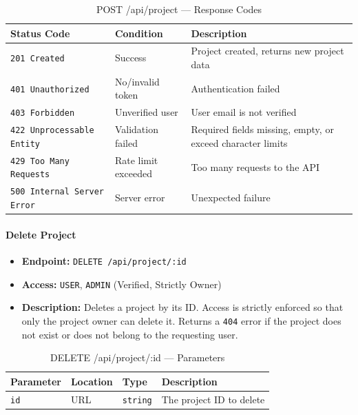 \begin{table}[H]
\centering
\renewcommand{\arraystretch}{1.3}
\begin{tabularx}{\textwidth}{|l|l|X|}
\hline
\textbf{Status Code} & \textbf{Condition} & \textbf{Description} \\
\hline
\texttt{201 Created}      & Success            & Project created, returns new project data \\
\hline
\texttt{401 Unauthorized} & No/invalid token   & Authentication failed \\
\hline
\texttt{403 Forbidden}    & Unverified user & User email is not verified \\
\hline
\texttt{422 Unprocessable Entity} & Validation failed & Required fields missing, empty, or exceed character limits \\
\hline
\texttt{429 Too Many Requests} & Rate limit exceeded & Too many requests to the API \\
\hline
\texttt{500 Internal Server Error} & Server error & Unexpected failure \\
\hline
\end{tabularx}
\caption{POST /api/project — Response Codes}
\label{tab:create-project-responses}
\end{table}
\FloatBarrier

\paragraph{Delete Project}
\label{subsubsec:delete-project}

\begin{itemize}
  \item \textbf{Endpoint:} \texttt{DELETE /api/project/:id}
  \item \textbf{Access:} \texttt{USER}, \texttt{ADMIN} (Verified, Strictly Owner)
  \item \textbf{Description:} Deletes a project by its ID.
  Access is strictly enforced so that only the project owner can delete it.
  Returns a \texttt{404} error if the project does not exist or does not belong to the requesting user.
\end{itemize}

\begin{table}[H]
\centering
\renewcommand{\arraystretch}{1.3}
\begin{tabularx}{\textwidth}{|l|l|l|X|}
\hline
\textbf{Parameter} & \textbf{Location} & \textbf{Type} & \textbf{Description} \\
\hline
\texttt{id} & URL & \texttt{string} & The project ID to delete \\
\hline
\end{tabularx}
\caption{DELETE /api/project/:id — Parameters}
\label{tab:delete-project-params}
\end{table}

